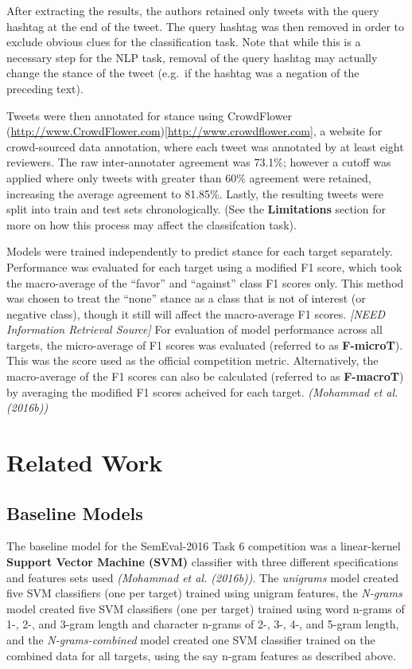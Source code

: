\documentclass[]{article}
\begin{document}
After extracting the results, the authors retained only tweets with the
query hashtag at the end of the tweet. The query hashtag was then
removed in order to exclude obvious clues for the classification task.
Note that while this is a necessary step for the NLP task, removal of
the query hashtag may actually change the stance of the tweet (e.g.~if
the hashtag was a negation of the preceding text).

Tweets were then annotated for stance using CrowdFlower
(\url{http://www.CrowdFlower.com}){[}\url{http://www.crowdflower.com}{]},
a website for crowd-sourced data annotation, where each tweet was
annotated by at least eight reviewers. The raw inter-annotater agreement
was 73.1\%; however a cutoff was applied where only tweets with greater
than 60\% agreement were retained, increasing the average agreement to
81.85\%. Lastly, the resulting tweets were split into train and test
sets chronologically. (See the \textbf{Limitations} section for more on
how this process may affect the classifcation task).

Models were trained independently to predict stance for each target
separately. Performance was evaluated for each target using a modified
F1 score, which took the macro-average of the ``favor'' and ``against''
class F1 scores only. This method was chosen to treat the ``none''
stance as a class that is not of interest (or negative class), though it
still will affect the macro-average F1 scores. \emph{{[}NEED Information
Retrieval Source{]}} For evaluation of model performance across all
targets, the micro-average of F1 scores was evaluated (referred to as
\textbf{F-microT}). This was the score used as the official competition
metric. Alternatively, the macro-average of the F1 scores can also be
calculated (referred to as \textbf{F-macroT}) by averaging the modified
F1 scores acheived for each target. \emph{(Mohammad et al. (2016b))}

\hypertarget{related-work}{%
\section{Related Work}\label{related-work}}

\hypertarget{baseline-models}{%
\subsection{Baseline Models}\label{baseline-models}}

The baseline model for the SemEval-2016 Task 6 competition was a
linear-kernel \textbf{Support Vector Machine (SVM)} classifier with
three different specifications and features sets used \emph{(Mohammad et
al. (2016b))}. The \emph{unigrams} model created five SVM classifiers
(one per target) trained using unigram features, the \emph{N-grams}
model created five SVM classifiers (one per target) trained using word
n-grams of 1-, 2-, and 3-gram length and character n-grams of 2-, 3-,
4-, and 5-gram length, and the \emph{N-grams-combined} model created one
SVM classifier trained on the combined data for all targets, using the
say n-gram features as described above.
\end{document}
